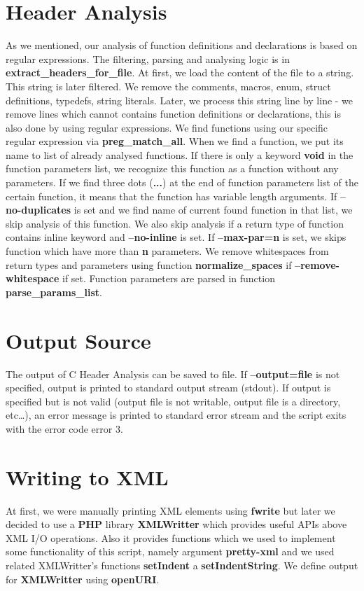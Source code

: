 \documentclass[10pt,a4paper]{article}
\begin{document}
\section{Header Analysis}
	As we mentioned, our analysis of function definitions and declarations is based on regular expressions. The filtering, parsing and analysing logic is in \textbf{extract\_headers\_for\_file}. At first, we load the content of the file to a string. This string is later filtered. We remove the comments, macros, enum, struct definitions, typedefs, string literals. Later, we process this string line by line - we remove lines which cannot contains function definitions or declarations, this is also done by using regular expressions. We find functions using our specific regular expression via \textbf{preg\_match\_all}. When we find a function, we put its name to list of already analysed functions. If there is only a keyword \textbf{void} in the function parameters list, we recognize this function as a function without any parameters. If we find three dots (\textbf{...}) at the end of function parameters list of the certain function, it means that the function has variable length arguments. If \textbf{--no-duplicates} is set and we find name of current found function in that list, we skip analysis of this function. We also skip analysis if a return type of function contains inline keyword and \textbf{--no-inline} is set. If \textbf{--max-par=n} is set, we skips function which have more than \textbf{n} parameters. We remove whitespaces from return types and parameters using function \textbf{normalize\_spaces} if \textbf{--remove-whitespace} if set. Function parameters are parsed in function \textbf{parse\_params\_list}.
	
\section{Output Source}
	The output of C Header Analysis can be saved to file. If \textbf{--output=file} is not specified, output is printed to standard output stream (stdout). If output is specified but is not valid (output file is not writable, output file is a directory, etc\dots), an error message is printed to standard error stream and the script exits with the error code error $3$.
	
\section{Writing to XML}
	At first, we were manually printing XML elements using \textbf{fwrite} but later we decided to use a \textbf{PHP} library \textbf{XMLWritter} which provides useful APIs above XML I/O operations. Also it provides functions which we used to implement some functionality of this script, namely argument  \textbf{pretty-xml} and we used related XMLWritter's functions \textbf{setIndent} a \textbf{setIndentString}. We define output for \textbf{XMLWritter} using \textbf{openURI}.
	
\end{document}
